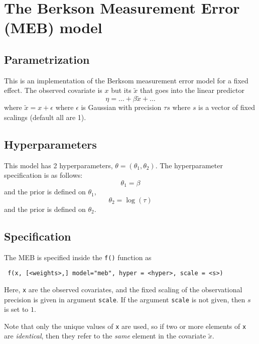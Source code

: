 \documentclass[a4paper,11pt]{article}
\begin{document}
\section*{The Berkson Measurement Error (MEB) model}

\subsection*{Parametrization}

This is an implementation of the Berksom measurement error model for a
fixed effect. The observed covariate is $x$ but its $\widetilde{x}$
that goes into the linear predictor
\begin{displaymath}
    \eta = \ldots + \beta \widetilde{x} + \ldots
\end{displaymath}
where $\widetilde{x} = x + \epsilon$ where $\epsilon{}$ is Gaussian
with precision $\tau s$
where $s$ is a vector of fixed scalings (default all are 1).



\subsection*{Hyperparameters}

This model has 2 hyperparameters, $\theta = (\theta_{1}, \theta_{2})$.
The hyperparameter specification is as follows:
\begin{displaymath}
    \theta_{1} = \beta
\end{displaymath}
and the prior is defined on $\theta_{1}$,
\begin{displaymath}
    \theta_{2} = \log(\tau)
\end{displaymath}
and the prior is defined on $\theta_{2}$.

\subsection*{Specification}

The MEB is specified inside the {\tt f()}
function as
\begin{verbatim}
 f(x, [<weights>,] model="meb", hyper = <hyper>, scale = <s>)
\end{verbatim}
Here, \texttt{x} are the observed covariates, and the fixed scaling of
the observational precision is given in argument \texttt{scale}. If
the argument \texttt{scale} is not given, then $s$ is set to $1$.

Note that only the unique values of \texttt{x} are used, so if two or
more elements of \texttt{x} are \emph{identical}, then they refer to
the \emph{same} element in the covariate $\widetilde{x}$.
\end{document}
